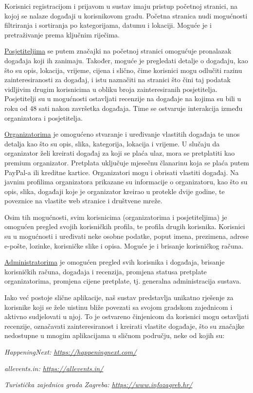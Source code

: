 		Korisnici registracijom i prijavom u sustav imaju pristup početnoj stranici, na kojoj se nalaze događaji u korisnikovom gradu. Početna stranica nudi mogućnosti filtriranja i sortiranja po kategorijama, datumu i lokaciji. Moguće je i pretraživanje prema ključnim riječima.

		\textit{}
		
		\underline{Posjetiteljima} se putem značajki na početnoj stranici omogućuje pronalazak događaja koji ih zanimaju. Također, moguće je pregledati detalje o događaju, kao što su opis, lokacija, vrijeme, cijena i slično, čime korisnici mogu odlučiti razinu zainteresiranosti za događaj, i istu naznačiti na stranici što čini taj podatak vidljivim drugim korisnicima u obliku broja zainteresiranih posjetitelja. Posjetitelji su u mogućnosti ostavljati recenzije na događaje na kojima su bili u roku od 48 sati nakon završetka događaja. Time se ostvaruje interakcija između organizatora i posjetitelja. 
		
		\underline{Organizatorima} je omogućeno stvaranje i uređivanje vlastitih događaja te unos detalja kao što su opis, slika, kategorija, lokacija i vrijeme. U slučaju da organizator želi kreirati događaj za koji se plaća ulaz, mora se pretplatiti kao premium organizator. Pretplata uključuje mjesečnu članarinu koja se plaća putem PayPal-a ili kreditne kartice. Organizatori mogu i obrisati vlastiti događaj. Na javnim profilima organizatora prikazane su informacije o organizatoru, kao što su opis, slika, događaji koje je organizator kreirao u protekle dvije godine, te poveznice na vlastite web stranice i društvene mreže.

		Osim tih mogućnosti, svim korisnicima (organizatorima i posjetiteljima) je omogućen pregled svojih korisničkih profila, te profila drugih korisnika. Korisnici su u mogućnosti i uređivati neke osobne podatke, poput imena, prezimena, adrese e-pošte, lozinke, korisničke slike i opisa. Moguće je i brisanje korisničkog računa.

		\underline{Administratorima} je omogućen pregled svih korisnika i događaja, brisanje korisničkih računa, događaja i recenzija, promjena statusa pretplate organizatorima, promjena cijene pretplate, tj. generalna administracija sustava.

		\textit{}
		
		Iako već postoje slične aplikacije, naš sustav predstavlja unikatno rješenje za korisnike koji se žele uistinu bliže povezati sa svojom gradskom zajednicom i aktivno sudjelovati u njoj. To je ostvareno činjenicom da korisnici mogu ostavljati recenzije, označavati zainteresiranost i kreirati vlastite događaje, što su značajke nedostupne u mnogim aplikacijama u sličnom području, neke od kojih su:
		 \begin{packed_item}
			\item \textit{HappeningNext: \url{https://happeningnext.com/}}
			\item \textit{allevents.in: \url{https://allevents.in/}}
			\item \textit{Turistička zajednica grada Zagreba: \url{https://www.infozagreb.hr/}}
		 \end{packed_item}	

